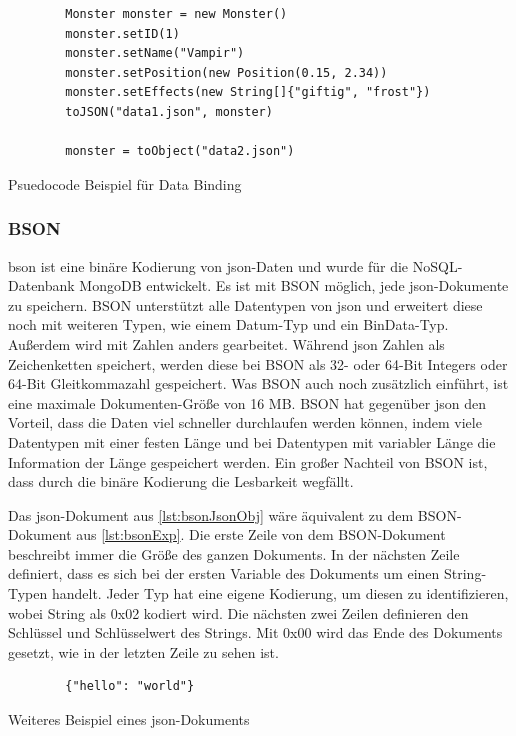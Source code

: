 \begin{listing}[htp]
    \begin{verbatim} 
        Monster monster = new Monster()
        monster.setID(1)
        monster.setName("Vampir")
        monster.setPosition(new Position(0.15, 2.34))
        monster.setEffects(new String[]{"giftig", "frost"})
        toJSON("data1.json", monster)

        monster = toObject("data2.json")
    \end{verbatim}
    \caption{Psuedocode Beispiel für Data Binding}
    \label{lst:dataBindingBsp}
\end{listing}

\subsubsection{BSON}
\ac{bson} ist eine binäre Kodierung von \ac{json}-Daten und wurde für die NoSQL-Datenbank MongoDB entwickelt. Es ist mit BSON möglich, jede \ac{json}-Dokumente zu speichern. BSON unterstützt alle Datentypen von \ac{json} und erweitert diese noch mit weiteren Typen, wie einem Datum-Typ und ein BinData-Typ. Außerdem wird mit Zahlen anders gearbeitet. Während \ac{json} Zahlen als Zeichenketten speichert, werden diese bei BSON als 32- oder 64-Bit Integers oder 64-Bit Gleitkommazahl gespeichert. Was BSON auch noch zusätzlich einführt, ist eine maximale Dokumenten-Größe von 16 MB. BSON hat gegenüber \ac{json} den Vorteil, dass die Daten viel schneller durchlaufen werden können, indem viele Datentypen mit einer festen Länge und bei Datentypen mit variabler Länge die Information der Länge gespeichert werden. Ein großer Nachteil von BSON ist, dass durch die binäre Kodierung die Lesbarkeit wegfällt.\cite{bsonspecBSONBinary}\cite{postgreSQLandBSON}\cite{mongodbJSONBSON}

Das \ac{json}-Dokument aus \ref{lst:bsonJsonObj} wäre äquivalent zu dem BSON-Dokument aus \ref{lst:bsonExp}. Die erste Zeile von dem BSON-Dokument beschreibt immer die Größe des ganzen Dokuments. In der nächsten Zeile definiert, dass es sich bei der ersten Variable des Dokuments um einen String-Typen handelt. Jeder Typ hat eine eigene Kodierung, um diesen zu identifizieren, wobei String als 0x02 kodiert wird. Die nächsten zwei Zeilen definieren den Schlüssel und Schlüsselwert des Strings. Mit 0x00 wird das Ende des Dokuments gesetzt, wie in der letzten Zeile zu sehen ist.

\begin{listing}[htp]
    \begin{verbatim}
        {"hello": "world"}
    \end{verbatim}
    \caption{Weiteres Beispiel eines \ac{json}-Dokuments \cite{mongodbJSONBSON}}
    \label{lst:bsonJsonObj}
\end{listing} 

